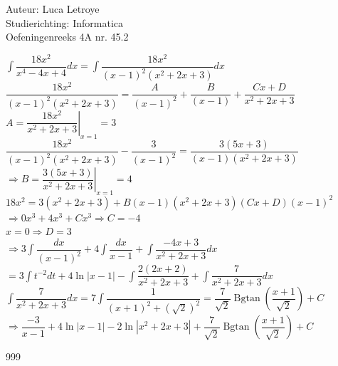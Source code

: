 \documentclass[a4paper]{article}
\newcommand{\dint}{\displaystyle\int}
\newcommand{\bgtan}{\operatorname{Bgtan}}
\begin{document}
  
\noindent \large Auteur: Luca Letroye \\
\noindent \large Studierichting: Informatica\\
\noindent \large Oefeningenreeks 4A nr. 45.2

\medskip
\normalsize

$\dint\dfrac{18x^2}{x^4-4x+4}dx = \dint\dfrac{18x^2}{(x-1)^2(x^2+2x+3)}dx$\\

$ \dfrac{18x^2}{(x-1)^2(x^2+2x+3)} = \dfrac{A}{(x-1)^2} + \dfrac{B}{(x-1)} + \dfrac{Cx+D}{x^2+2x+3}$\\

$A = \left.\dfrac{18x^2}{x^2+2x+3}\right|_{x=1} = 3$\\

$\dfrac{18x^2}{(x-1)^2(x^2+2x+3)} - \dfrac{3}{(x-1)^2} = \dfrac{3(5x+3)}{(x-1)(x^2+2x+3)}$\\

$\Rightarrow B = \left.\dfrac{3(5x+3)}{x^2+2x+3}\right|_{x=1} = 4$\\

$18x^2 = 3(x^2+2x+3) + B(x-1)(x^2+2x+3) (Cx+D)(x-1)^2$\\

$\Rightarrow 0x^3+4x^3+Cx^3 \Rightarrow C = -4$\\

$x = 0 \Rightarrow D = 3$\\

$\Rightarrow 3\dint\dfrac{dx}{(x-1)^2}+4\dint\dfrac{dx}{x-1}+\dint\dfrac{-4x+3}{x^2+2x+3}dx$\\

$ = 3\dint t^{-2}dt +4\ln|x-1| - \dint\dfrac{2(2x+2)}{x^2+2x+3}+\dint\dfrac{7}{x^2+2x+3}dx $\\

$\dint\dfrac{7}{x^2+2x+3}dx = 7\dint\dfrac{1}{(x+1)^2+(\sqrt{2})^2} = \dfrac{7}{\sqrt{2}}\bgtan\left(\dfrac{x+1}{\sqrt{2}}\right)+C$\\

$\Rightarrow \dfrac{-3}{x-1}+4\ln|x-1| -2\ln|x^2+2x+3| +\dfrac{7}{\sqrt{2}}\bgtan\left(\dfrac{x+1}{\sqrt{2}}\right)+C$\\



\begin{thebibliography}{999}
\end{thebibliography}
\end{document}
